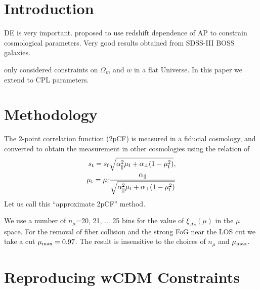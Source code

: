 \documentclass[useAMS,usenatbib]{mnras}
\begin{document}

\section{Introduction}


DE is very important. 
\citep{Li2016} proposed to use redshift dependence of AP to constrain cosmological parameters.
Very good results obtained from SDSS-III BOSS galaxies.

\citep{Li2016} only considered constraints on $\Omega_m$ and $w$ in a flat Universe.
In this paper we extend to CPL parameters.




\section{Methodology}

The 2-point correlation function (2pCF) is measured in a fiducial cosmology,
and converted to obtain the measurement in other cosmologies using the relation of 
\begin{eqnarray}
 s_{\rm t} = s_{\rm f} \sqrt{\alpha_{\parallel}^2 \mu_{\rm f}+\alpha_{\bot}(1-\mu_{\rm f}^2)}, \\
 \mu_{\rm t} = \mu_{\rm f} \frac{\alpha_\parallel}
 {\sqrt{\alpha_{\parallel}^2 \mu_{\rm f} +\alpha_{\bot}(1-\mu_{\rm f}^2)}}
\end{eqnarray}
Let us call this ``approximate 2pCF'' method.

We use a number of $n_{\mu}$=20, 21, ... 25 bins for the value of $\xi_{\Delta s}(\mu)$ in the $\mu$ space.
For the removal of fiber collision and the strong FoG near the LOS cut we take a cut $\mu_{\rm max} = 0.97$.
The result is insensitive to the choices of $n_\mu$ and $\mu_{\rm max}$.


\section{Reproducing wCDM Constraints}
\end{document}
